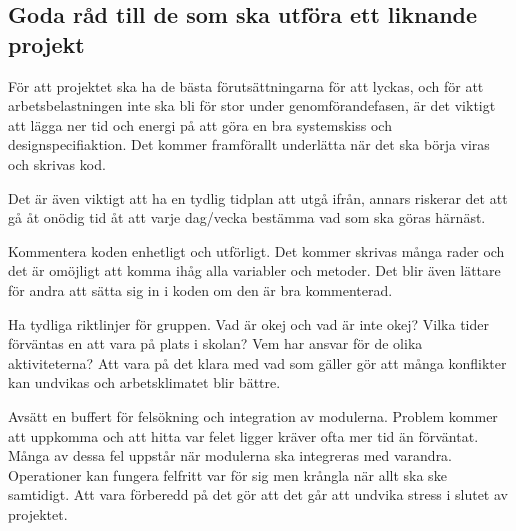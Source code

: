 \documentclass[11pt]{article}
\begin{document}
\subsection{Goda råd till de som ska utföra ett liknande projekt}
För att projektet ska ha de bästa förutsättningarna för att lyckas, och för att arbetsbelastningen inte ska bli för stor under genomförandefasen, är det viktigt att lägga ner tid och energi på att göra en bra systemskiss och designspecifiaktion. Det kommer framförallt underlätta när det ska börja viras och skrivas kod. 

Det är även viktigt att ha en tydlig tidplan att utgå ifrån, annars riskerar det att gå åt onödig tid åt att varje dag/vecka bestämma vad som ska göras härnäst.

Kommentera koden enhetligt och utförligt. Det kommer skrivas många rader och det är omöjligt att komma ihåg alla variabler och metoder. Det blir även lättare för andra att sätta sig in i koden om den är bra kommenterad. 

Ha tydliga riktlinjer för gruppen. Vad är okej och vad är inte okej? Vilka tider förväntas en att vara på plats i skolan? Vem har ansvar för de olika aktiviteterna? Att vara på det klara med vad som gäller gör att många konflikter kan undvikas och arbetsklimatet blir bättre.

Avsätt en buffert för felsökning och integration av modulerna. Problem kommer att uppkomma och att hitta var felet ligger kräver ofta mer tid än förväntat. Många av dessa fel uppstår när modulerna ska integreras med varandra. Operationer kan fungera felfritt var för sig men krångla när allt ska ske samtidigt. Att vara förberedd på det gör att det går att undvika stress i slutet av projektet. 
\end{document}
